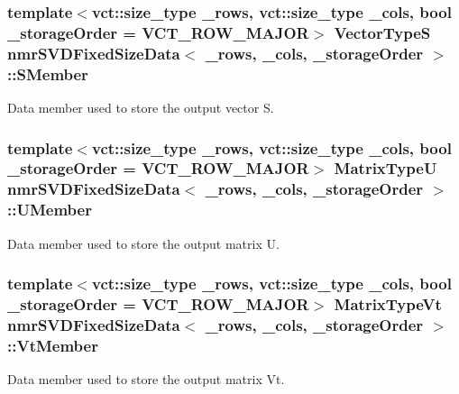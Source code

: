 \subsubsection[{S\+Member}]{\setlength{\rightskip}{0pt plus 5cm}template$<$vct\+::size\+\_\+type \+\_\+rows, vct\+::size\+\_\+type \+\_\+cols, bool \+\_\+storage\+Order = V\+C\+T\+\_\+\+R\+O\+W\+\_\+\+M\+A\+J\+O\+R$>$ {\bf Vector\+Type\+S} {\bf nmr\+S\+V\+D\+Fixed\+Size\+Data}$<$ \+\_\+rows, \+\_\+cols, \+\_\+storage\+Order $>$\+::S\+Member\hspace{0.3cm}{\ttfamily [protected]}}\label{classnmr_s_v_d_fixed_size_data_a4082c30345cdec4efd06e43a5343037e}
Data member used to store the output vector S. \hypertarget{classnmr_s_v_d_fixed_size_data_ad26dae6ca89cbab697b173587128bee8}{}
\subsubsection[{U\+Member}]{\setlength{\rightskip}{0pt plus 5cm}template$<$vct\+::size\+\_\+type \+\_\+rows, vct\+::size\+\_\+type \+\_\+cols, bool \+\_\+storage\+Order = V\+C\+T\+\_\+\+R\+O\+W\+\_\+\+M\+A\+J\+O\+R$>$ {\bf Matrix\+Type\+U} {\bf nmr\+S\+V\+D\+Fixed\+Size\+Data}$<$ \+\_\+rows, \+\_\+cols, \+\_\+storage\+Order $>$\+::U\+Member\hspace{0.3cm}{\ttfamily [protected]}}\label{classnmr_s_v_d_fixed_size_data_ad26dae6ca89cbab697b173587128bee8}
Data member used to store the output matrix U. \hypertarget{classnmr_s_v_d_fixed_size_data_a1c07f9c42ce77a3a5c4d922b551b678e}{}
\subsubsection[{Vt\+Member}]{\setlength{\rightskip}{0pt plus 5cm}template$<$vct\+::size\+\_\+type \+\_\+rows, vct\+::size\+\_\+type \+\_\+cols, bool \+\_\+storage\+Order = V\+C\+T\+\_\+\+R\+O\+W\+\_\+\+M\+A\+J\+O\+R$>$ {\bf Matrix\+Type\+Vt} {\bf nmr\+S\+V\+D\+Fixed\+Size\+Data}$<$ \+\_\+rows, \+\_\+cols, \+\_\+storage\+Order $>$\+::Vt\+Member\hspace{0.3cm}{\ttfamily [protected]}}\label{classnmr_s_v_d_fixed_size_data_a1c07f9c42ce77a3a5c4d922b551b678e}
Data member used to store the output matrix Vt. \hypertarget{classnmr_s_v_d_fixed_size_data_a2821e6d6be56a77b1584b9994d7b1a83}{}
